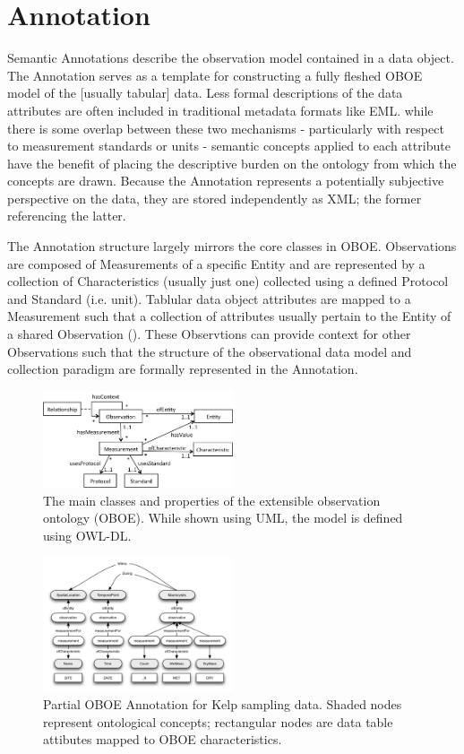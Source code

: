 
\section{Annotation}
\label{sec:annotation}

Semantic Annotations describe the observation model contained in a
data object. The Annotation serves as a template for constructing a
fully fleshed OBOE model of the [usually tabular] data. Less formal
descriptions of the data attributes are often included in traditional
metadata formats like EML. while there is some overlap between these
two mechanisms - particularly with respect to measurement standards or
units - semantic concepts applied to each attribute have the benefit
of placing the descriptive burden on the ontology from which the
concepts are drawn. Because the Annotation represents a potentially
subjective perspective on the data, they are stored independently as
XML; the former referencing the latter.

The Annotation structure largely mirrors the core classes in
OBOE. Observations are composed of Measurements of a specific Entity
and are represented by a collection of Characteristics (usually just
one) collected using a defined Protocol and Standard (i.e. unit).
Tablular data object attributes are mapped to a Measurement such that
a collection of attributes usually pertain to the Entity of a shared
Observation (). These Observtions can
provide context for other Observations such that the structure of the
observational data model and collection paradigm are formally
represented in the Annotation.

\begin{figure}
  \centering
  \includegraphics[width=0.5\textwidth]{images/oboe}
  \caption{The main classes and properties of the extensible
    observation ontology (OBOE). While shown using UML, the model is
    defined using OWL-DL.}
  \label{fig:oboe}
\end{figure}

\begin{figure}
\centering
\includegraphics[width=0.5\textwidth]{images/kelp-mass-model.png}
\caption{Partial OBOE Annotation for Kelp sampling data. Shaded nodes represent ontological concepts; rectangular nodes are data table attibutes mapped to OBOE characteristics.}
\label{fig:kelp-mass-model}
\end{figure}

